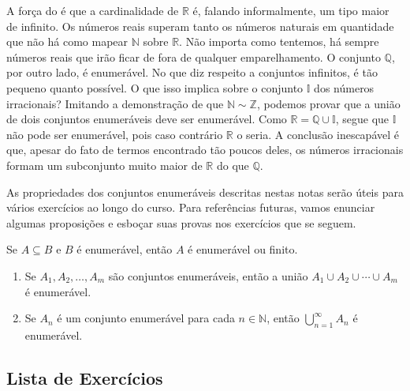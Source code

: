 A força do  é que a cardinalidade de $\mathbb{R}$ é, falando informalmente, um tipo maior de infinito. Os números reais superam tanto os números naturais em quantidade que não há como mapear $\mathbb{N}$ sobre $\mathbb{R}$. Não importa como tentemos, há sempre números reais que irão ficar de fora
de qualquer emparelhamento. O conjunto $\mathbb{Q}$, por outro lado, é enumerável. No que diz respeito a conjuntos infinitos, é tão pequeno quanto possível. O que isso implica sobre o conjunto $\mathbb{I}$ dos números irracionais? Imitando a demonstração de que $\mathbb{N} \sim \mathbb{Z}$, podemos provar que a união de dois conjuntos enumeráveis deve ser enumerável. Como $\mathbb{R} = \mathbb{Q} \cup \mathbb{I}$, segue que $\mathbb{I}$ não pode ser enumerável, pois caso contrário $\mathbb{R}$ o seria. A conclusão inescapável é que, apesar do fato de termos encontrado tão poucos deles, os números irracionais formam um subconjunto muito maior de $\mathbb{R}$ do que $\mathbb{Q}$.  

As propriedades dos conjuntos enumeráveis descritas nestas notas 
serão úteis para vários exercícios ao longo do curso. 
Para referências futuras, vamos enunciar algumas proposições 
e esboçar suas provas nos exercícios que se seguem.

 
\begin{theorem}\label{thm:subconjunto-enumeravel}
Se $A \subseteq B$ e $B$ é enumerável, então $A$ é enumerável ou finito.
\end{theorem}

 
\begin{theorem}\label{thm:uniao-enumeravel}
\begin{enumerate}[label=\roman*)]
\item Se $A_{1}, A_{2}, \ldots, A_{m}$ são conjuntos enumeráveis, então a união $A_{1} \cup A_{2} \cup \cdots \cup A_{m}$ é enumerável.
\item Se $A_{n}$ é um conjunto enumerável para cada $n \in \mathbb{N}$, então $\bigcup_{n=1}^{\infty} A_{n}$ é enumerável.
\end{enumerate}
\end{theorem}

\subsection{Lista de Exercícios}\label{subsec:exercicios-cardinalidade}


